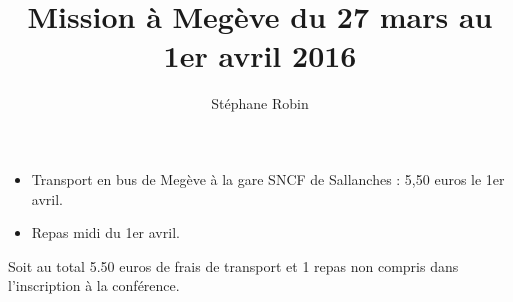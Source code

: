 \documentclass[12pt]{article}
\title{Mission à Megève du 27 mars au 1er avril 2016}
\author{Stéphane Robin}
\date{}
\begin{document}
\maketitle 



\begin{itemize}
\item Transport en bus de Megève à la gare SNCF de Sallanches : 5,50 euros le 1er avril.
\item Repas midi du 1er avril.


\end{itemize}

\bigskip
Soit au total 5.50 euros de frais de transport et 1 repas non compris dans l'inscription à la conférence.
\end{document}
